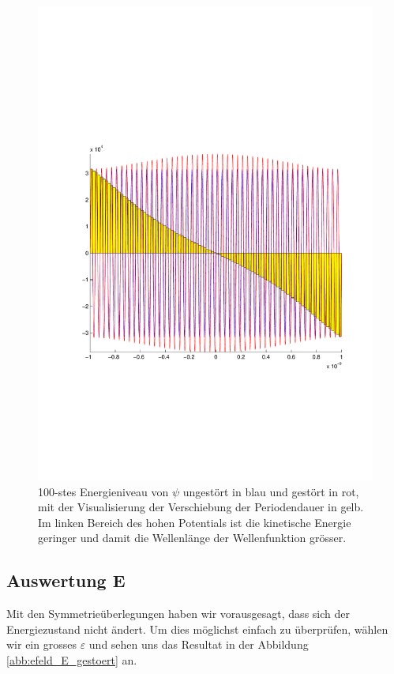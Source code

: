 \begin{refsection}
\begin{figure}
 \centering
 \includegraphics[width=12cm,clip=true,trim=2cm 7cm 1cm 8cm]{efeld/Psi_100_gestoert.pdf}
 \caption{100-stes Energieniveau von $\psi$ ungest\"ort in blau und gest\"ort in rot, 
          mit der Visualisierung der Verschiebung der Periodendauer in gelb.
          Im linken Bereich des hohen Potentials ist die kinetische Energie geringer und damit die Wellenl\"ange der Wellenfunktion gr\"osser.}
 \label{abb:efeld_psi_100_gestoert}
\end{figure}




\subsection{Auswertung E}

Mit den Symmetrie\"uberlegungen haben wir vorausgesagt, dass sich der Energiezustand nicht \"andert.
Um dies m\"oglichst einfach zu \"uberpr\"ufen, w\"ahlen wir ein grosses $\varepsilon$ und sehen uns das Resultat in der 
Abbildung \ref{abb:efeld_E_gestoert} an.


\end{refsection}
